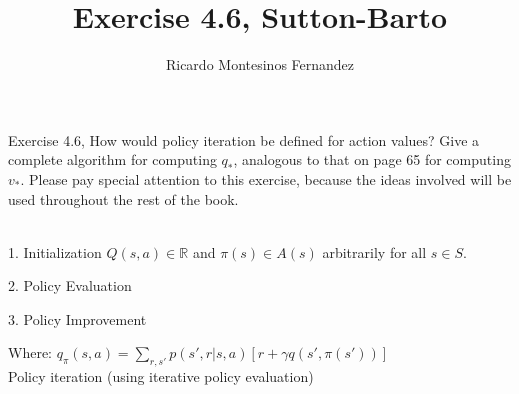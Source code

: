 \documentclass[12pt]{article}
\begin{document}
\title{Exercise 4.6, Sutton-Barto}
\author{Ricardo Montesinos Fernandez}
\date{\small{}}
\maketitle

Exercise 4.6, 
How would policy iteration be defined for action values? Give a complete algorithm for computing $q_{*}$, analogous to that on page 65 for computing $v_{*}$. Please pay special attention to this exercise, because the ideas involved will be used throughout the rest of the book.
\\ \\
\begin{algorithm}[H]
1. Initialization $Q(s,a) \in \mathbb{R}$ and $\pi(s) \in A(s)$ arbitrarily for all $s \in S$.

2. Policy Evaluation \\

3. Policy Improvement\\


Where:
$q_{\pi}(s,a) = \sum_{r,s'}^{ }p(s', r|s, a) [r + \gamma q(s', \pi(s'))]$\\

 \caption{Policy iteration (using iterative policy evaluation)}
\end{algorithm}
\end{document}
